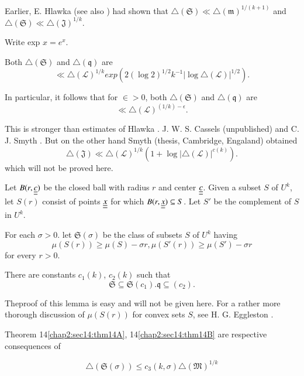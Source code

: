 Earlier, E. Hlawka \cite{10} (see also \cite{9}) had shown that $\triangle(\mathfrak{S})$\break $\ll \triangle(\mathfrak{m})^{1/(k+1)}$ and $\triangle(\mathfrak{S}) \ll \triangle (\mathfrak{J})^{1/k}$.

Write exp $x = e^{x}$.

\begin{theorem}\label{chap2:sec14:thm14B}
Both $\triangle(\mathfrak{S})$ and $\triangle(\mathfrak{q})$ are
$$
\ll \triangle(\mathscr{L})^{1/k} exp (2(\log 2)^{1/2} k^{-1} |\log \triangle (\mathscr{L})|^{1/2}).
$$
\end{theorem}

In particular, it follows that for $\in > 0$, both $\triangle (\mathfrak{S})$ and $\triangle (\mathfrak{q})$ are
$$
\ll \triangle (\mathscr{L})^{(1/k)-\epsilon}.
$$

This is stronger than estimates of Hlawka \cite{10}. J. W. S. Cassels (unpublished) and C. J. Smyth \cite{28}. But on the other hand Smyth (thesis, Cambridge, Engaland) obtained
$$
\triangle(\mathfrak{J}) \ll \triangle(\mathscr{L})^{1/k} (1 + \log |\triangle (\mathscr{L})|^{c(k)}).
$$
which will not be proved here.

Let $B(r, \underline{\underline{c}})$ be the closed ball with radius $r$ and center $ \underline{\underline{c}}$. Given a subset $S$ of $U^{k}$, let $S(r)$ consist of points $ \underline{\underline{x}}$ for which $B(r,  \underline{\underline{x}}) \subseteq S$. Let $S'$ be the complement of $S$ in $U^{k}$.

For each $\sigma > 0$. let $\mathfrak{S} (\sigma)$ be the class of subsets $S$ of $U^{k}$ having 
\begin{equation*}
\mu (S(r)) \geq \mu(S) - \sigma r, \mu (S'(r)) \geq \mu(S') - \sigma r\tag{14.1}\label{chap2:sec14:eq14.1}
\end{equation*}
for every $r > 0$.

\begin{lemma}\label{chap2:sec14:lem14C}
There are constants $c_{1}(k)$, $c_{2}(k)$ such that
$$
\mathfrak{S} \subseteq \mathfrak{S} (c_{1}). \mathfrak{q} \subseteq (c_{2}).
$$
\end{lemma}

The\pageoriginale proof of this lemma is easy and will not be given here. For a rather more thorough discussion of $\mu(S(r))$ for convex sets $S$, see H. G. Eggleston \cite{4}.

Theorem 14\ref{chap2:sec14:thm14A}, 14\ref{chap2:sec14:thm14B} are respective consequences of

\setcounter{theorem}{2}
\begin{theorem}\label{chap2:sec14:thm14C}
$$
\triangle (\mathfrak{S}(\sigma)) \leq c_{3} (k, \sigma) \triangle (\mathfrak{M})^{1/k}
$$
\end{theorem} 

